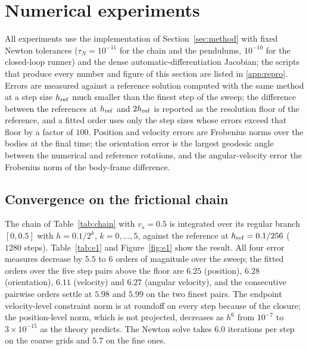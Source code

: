 \section{Numerical experiments}
\label{sec:numerical}

All experiments use the implementation of Section~\ref{sec:method} with fixed Newton tolerances
($\tau_N=10^{-11}$ for the chain and the pendulums, $10^{-10}$ for the closed-loop runner) and the
dense automatic-differentiation Jacobian; the scripts that produce every
number and figure of this section are listed in \ref{app:repro}. Errors are measured
against a reference solution computed with the same method at a step size $h_{\rm ref}$ much
smaller than the finest step of the sweep; the difference between the references at $h_{\rm ref}$
and $2h_{\rm ref}$ is reported as the resolution floor of the reference, and a fitted order uses only
the step sizes whose errors exceed that floor by a factor of $100$. Position and velocity errors are
Frobenius norms over the bodies at the final time; the orientation error is the largest geodesic
angle between the numerical and reference rotations, and the angular-velocity error the Frobenius
norm of the body-frame difference.

\subsection{Convergence on the frictional chain}
\label{sec:e1}

The chain of Table~\ref{tab:chain} with $v_s=0.5$ is integrated over its regular branch $[0,0.5]$
with $h=0.1/2^k$, $k=0,\dots,5$, against the reference at $h_{\rm ref}=0.1/256$ ($1280$ steps).
Table~\ref{tab:e1} and Figure~\ref{fig:e1} show the result. All four error measures decrease by
$5.5$ to $6$ orders of magnitude over the sweep; the fitted orders over the five step pairs above
the floor are $6.25$ (position), $6.28$ (orientation), $6.11$ (velocity) and $6.27$ (angular
velocity), and the consecutive pairwise orders settle at $5.98$ and $5.99$ on the two finest
pairs. The endpoint velocity-level constraint norm is at roundoff on every step because of the
closure; the position-level norm, which is not projected, decreases as $h^6$ from $10^{-7}$ to
$3\times10^{-15}$ as the theory predicts. The Newton solve takes $6.0$ iterations per step on the
coarse grids and $5.7$ on the fine ones.

